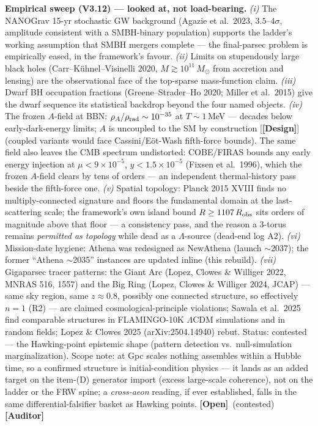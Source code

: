 \documentclass[11pt]{article}
\newcommand{\Open}{\textbf{\textcolor{gray!10!black}{[Open]}}}
\newcommand{\Auditor}{\textbf{\textcolor{teal!55!black}{[Auditor]}}}
\newcommand{\design}{\textcolor{blue!60!black}{\textbf{[Design]}}}
\newcommand{\msun}{M_\odot}
\begin{document}
\medskip\noindent\textbf{Empirical sweep (V3.12) --- looked at, not load-bearing.} \emph{(i)} The NANOGrav 15-yr stochastic GW background (Agazie et al.\ 2023, $3.5$--$4\sigma$, amplitude consistent with a SMBH-binary population) supports the ladder's working assumption that SMBH mergers complete --- the final-parsec problem is empirically eased, in the framework's favour. \emph{(ii)} Limits on stupendously large black holes (Carr--K\"uhnel--Visinelli 2020, $M\gtrsim10^{11}\,\msun$ from accretion and lensing) are the observational face of the top-sparse mass-function claim. \emph{(iii)} Dwarf BH occupation fractions (Greene--Strader--Ho 2020; Miller et al.\ 2015) give the dwarf sequence its statistical backdrop beyond the four named objects. \emph{(iv)} The frozen $A$-field at BBN: $\rho_A/\rho_{\rm rad}\sim10^{-35}$ at $T\sim1$\,MeV --- decades below early-dark-energy limits; $A$ is uncoupled to the SM by construction [\design] (coupled variants would face Cassini/E\"ot-Wash fifth-force bounds). The same field also leaves the CMB spectrum undistorted: COBE/FIRAS bounds any early energy injection at $\mu<9\times10^{-5}$, $y<1.5\times10^{-5}$ (Fixsen et al.\ 1996), which the frozen $A$-field clears by tens of orders --- an independent thermal-history pass beside the fifth-force one. \emph{(v)} Spatial topology: Planck 2015 XVIII finds no multiply-connected signature and floors the fundamental domain at the last-scattering scale; the framework's own island bound $R\ge1107\,R_{\rm obs}$ sits orders of magnitude above that floor --- a consistency pass, and the reason a 3-torus remains \emph{permitted as topology} while dead as a $\Lambda$-source (dead-end log A2). \emph{(vi)} Mission-date hygiene: Athena was redesigned as NewAthena (launch $\sim$2037); the former ``Athena $\sim$2035'' instances are updated inline (this rebuild). \emph{(vii)} Gigaparsec tracer patterns: the Giant Arc (Lopez, Clowes \& Williger 2022, MNRAS 516, 1557) and the Big Ring (Lopez, Clowes \& Williger 2024, JCAP) --- same sky region, same $z\approx0.8$, possibly one connected structure, so effectively $n=1$ (R2) --- are claimed cosmological-principle violations; Sawala et al.\ 2025 find comparable structures in FLAMINGO-10K $\Lambda$CDM simulations and in random fields; Lopez \& Clowes 2025 (arXiv:2504.14940) rebut. Status: contested --- the Hawking-point epistemic shape (pattern detection vs.\ null-simulation marginalization). Scope note: at Gpc scales nothing assembles within a Hubble time, so a confirmed structure is initial-condition physics --- it lands as an added target on the item-(D) generator import (excess large-scale coherence), not on the ladder or the FRW spine; a \emph{cross-aeon} reading, if ever established, falls in the same differential-falsifier basket as Hawking points. \Open\ (contested) \Auditor
\end{document}
